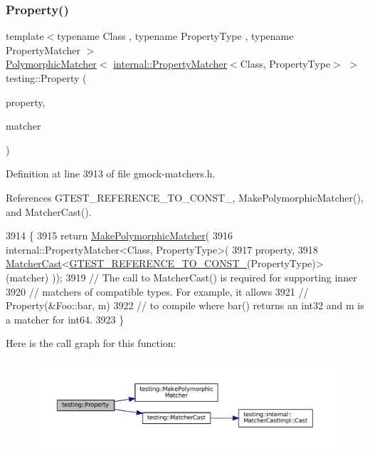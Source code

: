 \subsubsection{\texorpdfstring{Property()}{Property()}}
{\footnotesize\ttfamily template$<$typename Class , typename Property\+Type , typename Property\+Matcher $>$ \\
\hyperlink{classtesting_1_1PolymorphicMatcher}{Polymorphic\+Matcher}$<$ \hyperlink{classtesting_1_1internal_1_1PropertyMatcher}{internal\+::\+Property\+Matcher}$<$Class, Property\+Type$>$ $>$ testing\+::\+Property (\begin{DoxyParamCaption}\item[{Property\+Type(Class\+::$\ast$)() const}]{property,  }\item[{const Property\+Matcher \&}]{matcher }\end{DoxyParamCaption})\hspace{0.3cm}{\ttfamily [inline]}}



Definition at line 3913 of file gmock-\/matchers.\+h.



References G\+T\+E\+S\+T\+\_\+\+R\+E\+F\+E\+R\+E\+N\+C\+E\+\_\+\+T\+O\+\_\+\+C\+O\+N\+S\+T\+\_\+, Make\+Polymorphic\+Matcher(), and Matcher\+Cast().


\begin{DoxyCode}
3914                                                                            \{
3915   \textcolor{keywordflow}{return} \hyperlink{namespacetesting_a667ca94f190ec2e17ee2fbfdb7d3da04}{MakePolymorphicMatcher}(
3916       internal::PropertyMatcher<Class, PropertyType>(
3917           property,
3918           \hyperlink{namespacetesting_a8234d15eee99b135a7fdf2141a2ebe1f}{MatcherCast}<\hyperlink{gtest-internal_8h_a9f91fcd24cae0b48fdaeb19102dac525}{GTEST\_REFERENCE\_TO\_CONST\_}(PropertyType)>(matcher)
      ));
3919   \textcolor{comment}{// The call to MatcherCast() is required for supporting inner}
3920   \textcolor{comment}{// matchers of compatible types.  For example, it allows}
3921   \textcolor{comment}{//   Property(&Foo::bar, m)}
3922   \textcolor{comment}{// to compile where bar() returns an int32 and m is a matcher for int64.}
3923 \}
\end{DoxyCode}
Here is the call graph for this function\+:
\nopagebreak
\begin{figure}[H]
\begin{center}
\leavevmode
\includegraphics[width=350pt]{namespacetesting_a0fad10571e23f7bc0d5c83d4c31ba740_cgraph}
\end{center}
\end{figure}
\mbox{\label{namespacetesting_a0a4a364121ea3fa656a112f1c2e6b7a4}} 
